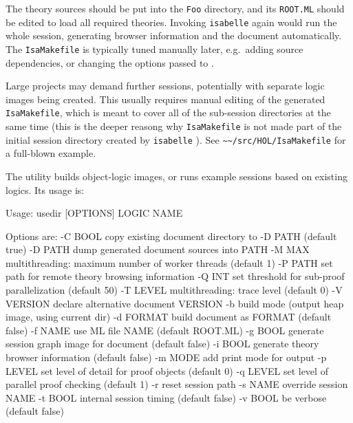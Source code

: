 \begin{isabellebody}
\begin{isamarkuptext}
  \noindent The theory sources should be put into the \verb|Foo|
  directory, and its \verb|ROOT.ML| should be edited to load all
  required theories.  Invoking \verb|isabelle| \hyperlink{tool.make}{\mbox{}} again
  would run the whole session, generating browser information and the
  document automatically.  The \verb|IsaMakefile| is typically
  tuned manually later, e.g.\ adding source dependencies, or changing
  the options passed to \hyperlink{tool.usedir}{\mbox{}}.

  \medskip Large projects may demand further sessions, potentially
  with separate logic images being created.  This usually requires
  manual editing of the generated \verb|IsaMakefile|, which is
  meant to cover all of the sub-session directories at the same time
  (this is the deeper reasong why \verb|IsaMakefile| is not made
  part of the initial session directory created by \verb|isabelle| \hyperlink{tool.mkdir}{\mbox{}}).  See \verb|~~/src/HOL/IsaMakefile| for
  a full-blown example.%
\end{isamarkuptext}%
\isamarkuptrue%
%
\isamarkuptrue%
%
\begin{isamarkuptext}%
The \hypertarget{tool.usedir}{\hyperlink{tool.usedir}{\mbox{}}} utility builds object-logic images, or runs
  example sessions based on existing logics. Its usage is:
\begin{ttbox}

Usage: usedir [OPTIONS] LOGIC NAME

  Options are:
    -C BOOL      copy existing document directory to -D PATH (default true)
    -D PATH      dump generated document sources into PATH
    -M MAX       multithreading: maximum number of worker threads (default 1)
    -P PATH      set path for remote theory browsing information
    -Q INT       set threshold for sub-proof parallelization (default 50)
    -T LEVEL     multithreading: trace level (default 0)
    -V VERSION   declare alternative document VERSION
    -b           build mode (output heap image, using current dir)
    -d FORMAT    build document as FORMAT (default false)
    -f NAME      use ML file NAME (default ROOT.ML)
    -g BOOL      generate session graph image for document (default false)
    -i BOOL      generate theory browser information (default false)
    -m MODE      add print mode for output
    -p LEVEL     set level of detail for proof objects (default 0)
    -q LEVEL     set level of parallel proof checking (default 1)
    -r           reset session path
    -s NAME      override session NAME
    -t BOOL      internal session timing (default false)
    -v BOOL      be verbose (default false)


\end{ttbox}
\end{isamarkuptext}
\end{isabellebody}
